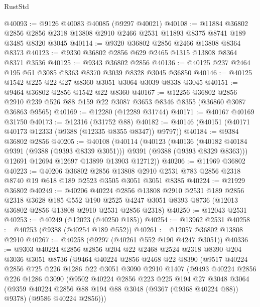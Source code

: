 \begin{lexlean}{RustStd}
\begin{coremodule}
@40093 := @9126 @40083 @40085 (@9297 @40021)
@40108 := @11884
    @36802
    @2856
    @2856
    @2318
    @13808
    @2910
    @2466
    @2531
    @11893
    @8375
    @8741
    @189
    @3485
    @8320
    @3045
@40114 := @9320 @36802 @2856 @2466 @13808 @8364 @8373
@40123 := @9330 @36802 @2856 @629 @2465 @1315 @13808 @8364 @8371 @3536
@40125 := @9343 @36802 @2856
@40136 := @40125 @237 @2464 @195 @51 @3085 @8363 @8370 @3039 @8328 @3045 @36850
@40146 := @40125 @1542 @225 @22 @27 @8360 @3051 @3064 @3039 @8338 @3045
@40151 := @9464 @36802 @2856 @1542 @22 @8360
@40167 := @12256
    @36802
    @2856
    @2910
    @239
    @526
    @88
    @159
    @22
    @3087
    @3653
    @8346
    @8355
    (@36860 @3087 @36863 @9565)
@40169 := @12280 (@12289 @31744)
@40171 := @40167 @40169 @31750
@40173 := @12316 (@31752 @88)
@40182 := @40146 (@40151 (@40171 @40173 @12333 (@9388 (@12335 @8355 @8347)) @9797))
@40184 := @9384 @36802 @2856
@40205 := @40108
    (@40114
      (@40123
        (@40136 (@40182 @40184 @9391 (@9388 (@9393 @8339 @3051))) @9391 (@9388 (@9393 @8329 @8363)))
        @12691
        @12694
        @12697
        @13899
        @13903
        @12712))
@40206 := @11969 @36802
@40223 := @40206
    @36802
    @2856
    @13808
    @2910
    @2531
    @783
    @2856
    @2318
    @8740
    @19
    @618
    @189
    @2523
    @3505
    @3051
    @3051
    @8385
@40224 := @21929 @36802
@40249 := @40206
    @40224
    @2856
    @13808
    @2910
    @2531
    @189
    @2856
    @2318
    @3628
    @185
    @552
    @190
    @2525
    @4247
    @3051
    @8393
    @8736
    (@12013 @36802 @2856 @13808 @2910 @2531 @2856 @2318)
@40250 := @12043 @2531
@40253 := @40249 (@12023 (@40250 @185))
@40254 := @13962 @2531
@40258 := @40253 (@9388 (@40254 @189 @552))
@40261 := @12057 @36802 @13808 @2910
@40267 := @40258 (@9297 (@40261 @552 @190 @4247 @3051))
@40336 := @9303
    @40224
    @2856
    @2856
    @204
    @22
    @2468
    @2524
    @2318
    @8390
    @204
    @3036
    @3051
    @8736
    (@9464
      @40224
      @2856
      @2468
      @22
      @8390
      (@9517
        @40224
        @2856
        @725
        @226
        @1286
        @22
        @3051
        @3090
        @2910
        @1407
        (@9493
          @40224
          @2856
          @226
          @1286
          @3090
          (@9502
            @40224
            @2856
            @223
            @225
            @194
            @27
            @3048
            @3064
            (@9359 @40224 @2856 @88 @194 @88 @3048 (@9367 (@9368 @40224 @88)) @9378)
            (@9586 @40224 @2856)))

\end{coremodule}
\end{lexlean}
